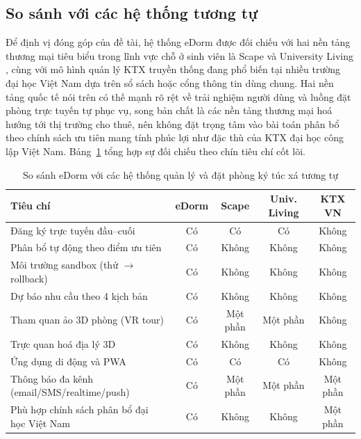 \documentclass[../DoAn.tex]{subfiles}
\begin{document}
\subsection{So sánh với các hệ thống tương tự}
\label{subsection:6.1.1}

Để định vị đóng góp của đề tài, hệ thống eDorm được đối chiếu với hai nền tảng
thương mại tiêu biểu trong lĩnh vực chỗ ở sinh viên là Scape \cite{scape_housing}
và University Living \cite{university_living}, cùng với mô hình quản lý KTX
truyền thống đang phổ biến tại nhiều trường đại học Việt Nam dựa trên sổ sách
hoặc cổng thông tin dùng chung. Hai nền tảng quốc tế nói trên có thế mạnh rõ
rệt về trải nghiệm người dùng và luồng đặt phòng trực tuyến tự phục vụ, song
bản chất là các nền tảng thương mại hoá hướng tới thị trường cho thuê, nên không
đặt trọng tâm vào bài toán phân bổ theo chính sách ưu tiên mang tính phúc lợi
như đặc thù của KTX đại học công lập Việt Nam. Bảng~\ref{tab:sosanh} tổng hợp
sự đối chiếu theo chín tiêu chí cốt lõi.

\begin{table}[H]
\centering
\caption{So sánh eDorm với các hệ thống quản lý và đặt phòng ký túc xá tương tự}
\label{tab:sosanh}
\small
\begin{tabular}{p{5.4cm}cccc}
\toprule
\textbf{Tiêu chí} & \textbf{eDorm} & \textbf{Scape} & \textbf{Univ. Living} & \textbf{KTX VN} \\
\midrule
Đăng ký trực tuyến đầu--cuối                 & Có       & Có       & Có       & Không     \\
Phân bổ tự động theo điểm ưu tiên            & Có       & Không    & Không    & Không     \\
Môi trường sandbox (thử $\to$ rollback)      & Có       & Không    & Không    & Không     \\
Dự báo nhu cầu theo 4 kịch bản               & Có       & Không    & Không    & Không     \\
Tham quan ảo 3D phòng (VR tour)              & Có       & Một phần & Một phần & Không     \\
Trực quan hoá địa lý 3D                      & Có       & Không    & Không    & Không     \\
Ứng dụng di động và PWA                      & Có       & Có       & Có       & Không     \\
Thông báo đa kênh (email/SMS/realtime/push)  & Có       & Một phần & Một phần & Một phần  \\
Phù hợp chính sách phân bổ đại học Việt Nam  & Có       & Không    & Không    & Một phần  \\
\bottomrule
\end{tabular}
\end{table}
\end{document}
